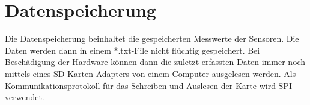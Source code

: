 \section{Datenspeicherung}
\label{chap:data}
Die Datenspeicherung beinhaltet die gespeicherten Messwerte der Sensoren. Die Daten werden dann in einem *.txt-File nicht flüchtig gespeichert. Bei Beschädigung der Hardware können dann die zuletzt erfassten Daten immer noch mittels eines SD-Karten-Adapters von einem Computer ausgelesen werden. Als Kommunikationsprotokoll für das Schreiben und Auslesen der Karte wird SPI verwendet.\\



